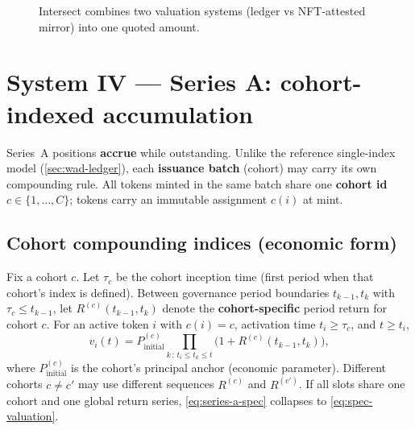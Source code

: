 \documentclass[11pt,a4paper]{article}
\begin{document}
\begin{figure}[htbp]
\centering
{}
\caption{Intersect combines two valuation systems (ledger vs NFT-attested mirror) into one quoted amount.}
\label{fig:intersect}
\end{figure}

\section{System IV --- Series A: cohort-indexed accumulation}
\label{sec:series-a}

Series~A positions \textbf{accrue} while outstanding. Unlike the reference single-index model (\cref{sec:wad-ledger}), each \textbf{issuance batch} (cohort) may carry its own compounding rule. All tokens minted in the same batch share one \textbf{cohort id} $c \in \{1,\ldots,C\}$; tokens carry an immutable assignment $c(i)$ at mint.

\subsection{Cohort compounding indices (economic form)}

Fix a cohort $c$. Let $\tau_c$ be the cohort inception time (first period when that cohort's index is defined). Between governance period boundaries $t_{k-1}, t_k$ with $\tau_c \le t_{k-1}$, let $R^{(c)}(t_{k-1},t_k)$ denote the \textbf{cohort-specific} period return for cohort $c$. For an active token $i$ with $c(i)=c$, activation time $t_i \ge \tau_c$, and $t \ge t_i$,
\begin{equation}
\label{eq:series-a-spec}
v_i(t) = P^{(c)}_{\mathrm{initial}}
\prod_{k\,:\,t_i \le t_k \le t}
\bigl(1 + R^{(c)}(t_{k-1},t_k)\bigr),
\end{equation}
where $P^{(c)}_{\mathrm{initial}}$ is the cohort's principal anchor (economic parameter). Different cohorts $c \neq c'$ may use different sequences $R^{(c)}$ and $R^{(c')}$. If all slots share one cohort and one global return series, \eqref{eq:series-a-spec} collapses to \eqref{eq:spec-valuation}.
\end{document}
